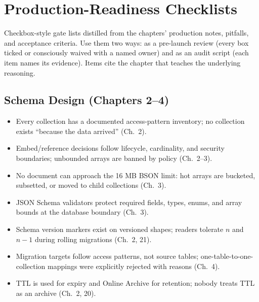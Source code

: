 \chapter{Production-Readiness Checklists}
%
Checkbox-style gate lists distilled from the chapters' production notes, pitfalls, and acceptance
criteria. Use them two ways: as a pre-launch review (every box ticked or consciously waived with a
named owner) and as an audit script (each item names its evidence). Items cite the chapter that
teaches the underlying reasoning.

\section{Schema Design (Chapters 2--4)}
%
\begin{itemize}
    \item[$\square$] Every collection has a documented access-pattern inventory; no collection exists ``because the data arrived'' (Ch.~2).
    \item[$\square$] Embed/reference decisions follow lifecycle, cardinality, and security boundaries; unbounded arrays are banned by policy (Ch.~2--3).
    \item[$\square$] No document can approach the 16 MB BSON limit: hot arrays are bucketed, subsetted, or moved to child collections (Ch.~3).
    \item[$\square$] JSON Schema validators protect required fields, types, enums, and array bounds at the database boundary (Ch.~3).
    \item[$\square$] Schema version markers exist on versioned shapes; readers tolerate $n$ and $n-1$ during rolling migrations (Ch.~2, 21).
    \item[$\square$] Migration targets follow access patterns, not source tables; one-table-to-one-collection mappings were explicitly rejected with reasons (Ch.~4).
    \item[$\square$] TTL is used for expiry and Online Archive for retention; nobody treats TTL as an archive (Ch.~2, 20).
\end{itemize}

